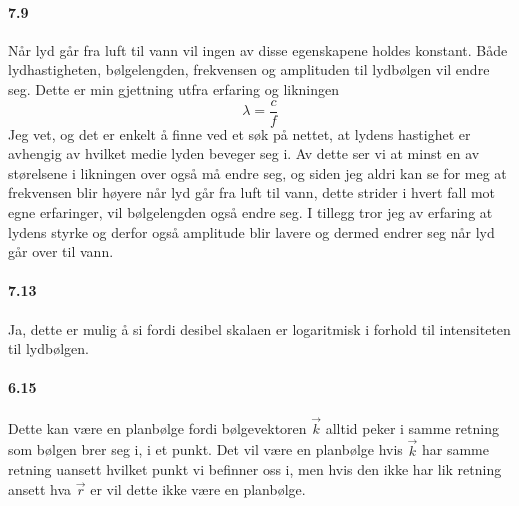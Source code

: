 \documentclass[11pt, A4paper,norsk]{article}
\begin{document}
		\paragraph{7.9}
			\begin{flushleft}
Når lyd går fra luft til vann vil ingen av disse egenskapene holdes konstant. Både lydhastigheten, bølgelengden, frekvensen og amplituden til lydbølgen vil endre seg. Dette er min gjettning utfra erfaring og likningen
$$\lambda = \frac{c}{f}$$
Jeg vet, og det er enkelt å finne ved et søk på nettet, at lydens hastighet er avhengig av hvilket medie lyden beveger seg i. Av dette ser vi at minst en av størelsene i likningen over også må endre seg, og siden jeg aldri kan se for meg at frekvensen blir høyere når lyd går fra luft til vann, dette strider i hvert fall mot egne erfaringer, vil bølgelengden også endre seg. I tillegg tror jeg av erfaring at lydens styrke og derfor også amplitude blir lavere og dermed endrer seg når lyd går over til vann.
			\end{flushleft}









		\paragraph{7.13}
			\begin{flushleft}
Ja, dette er mulig å si fordi desibel skalaen er logaritmisk i forhold til intensiteten til lydbølgen.
			\end{flushleft}












		\paragraph{6.15}
			\begin{flushleft}
Dette kan være en planbølge fordi bølgevektoren $\vec{k}$ alltid peker i samme retning som bølgen brer seg i, i et punkt. Det vil være en planbølge hvis $\vec{k}$ har samme retning uansett hvilket punkt vi befinner oss i, men hvis den ikke har lik retning ansett hva $\vec{r}$ er vil dette ikke være en planbølge.
			\end{flushleft}
\end{document}
